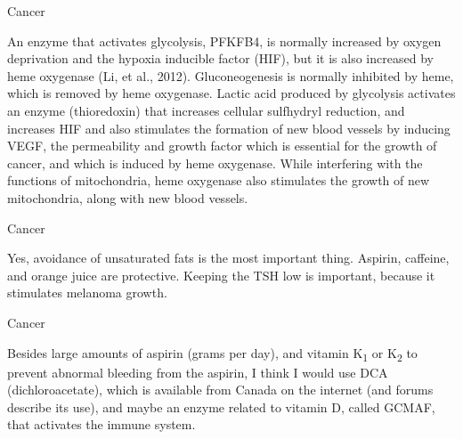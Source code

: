 \documentclass[11pt,oneside,openany,extrafontsizes]{memoir}
\begin{document}
\begin{standalonequote}{Cancer}

    \begin{answer}
        An enzyme that activates glycolysis, PFKFB4, is normally increased by oxygen deprivation and the hypoxia inducible factor (HIF), but it is also increased by heme oxygenase (Li, et al., 2012). Gluconeogenesis is normally inhibited by heme, which is removed by heme oxygenase. Lactic acid produced by glycolysis activates an enzyme (thioredoxin) that increases cellular sulfhydryl reduction, and increases HIF and also stimulates the formation of new blood vessels by inducing VEGF, the permeability and growth factor which is essential for the growth of cancer, and which is induced by heme oxygenase. While interfering with the functions of mitochondria, heme oxygenase also stimulates the growth of new mitochondria, along with new blood vessels.
    \end{answer}
\end{standalonequote}

\begin{standalonequote}{Cancer}

    \begin{answer}
        Yes, avoidance of unsaturated fats is the most important thing. Aspirin, caffeine, and orange juice are protective. Keeping the TSH low is important, because it stimulates melanoma growth. 
    \end{answer}
\end{standalonequote}

\begin{standalonequote}{Cancer}

    \begin{answer}
        Besides large amounts of aspirin (grams per day), and vitamin K\textsubscript{1} or K\textsubscript{2} to prevent abnormal bleeding from the aspirin, I think I would use DCA (dichloroacetate), which is available from Canada on the internet (and forums describe its use), and maybe an enzyme related to vitamin D, called GCMAF, that activates the immune system.
    \end{answer}
\end{standalonequote}
\end{document}
